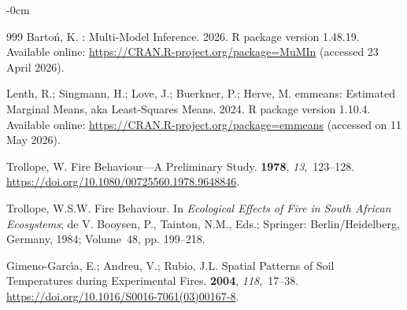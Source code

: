 \documentclass[fire,article,accept,oneauthor,pdftex]{Definitions/mdpi}
\begin{document}
\begin{adjustwidth}{-\extralength}{0cm}
\begin{thebibliography}{999}
Barto{\'n}, K.
: {{Multi-Model}} Inference.  2026. 
\newblock R package version 1.48.19. 
\newblock Available online: \url{https://CRAN.R-project.org/package=MuMIn} (accessed 23 April 2026).


Lenth, R.; Singmann, H.; Love, J.; Buerkner, P.; Herve, M.
\newblock emmeans: {{Estimated Marginal Means, aka Least-Squares Means}}.
  2024.
 \newblock R package version 1.10.4.
 \newblock Available online: \url{https://CRAN.R-project.org/package=emmeans} (accessed on 11 May 2026).


Trollope, W.
\newblock Fire Behaviour---{{A}} Preliminary Study.
 {\bf 1978}, {\em 13},~123--128.
\newblock
  \url{https://doi.org/10.1080/00725560.1978.9648846}.

Trollope, W.S.W.
\newblock Fire Behaviour. In {\em Ecological Effects of Fire in {{South
  African}} Ecosystems}; {de V. Booysen}, P., Tainton, N.M., Eds.; Springer: Berlin/Heidelberg, Germany,
  1984; Volume~48, pp. 199--218.

{Gimeno-Garc{\'{\i}}a}, E.; Andreu, V.; Rubio, J.L.
\newblock Spatial Patterns of Soil Temperatures during Experimental Fires.
 {\bf 2004}, {\em 118},~17--38.
\newblock
  \url{https://doi.org/10.1016/S0016-7061(03)00167-8}.


\end{thebibliography}
\end{adjustwidth}
\end{document}
